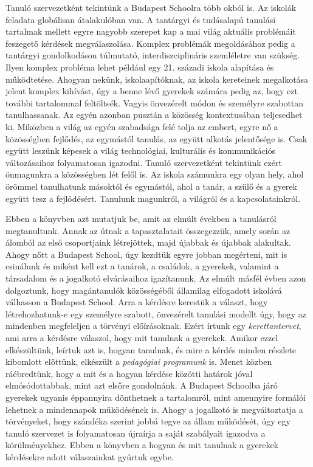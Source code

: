 Tanuló szervezetként tekintünk a Budapest Schoolra több okból is. Az iskolák feladata globálisan átalakulóban van. A tantárgyi és tudásalapú tanulási tartalmak mellett egyre nagyobb szerepet kap a mai világ aktuális problémáit feszegető kérdések megválaszolása. Komplex problémák megoldásához pedig a tantárgyi gondolkodáson túlmutató, interdiszciplináris szemléletre van szükség. Ilyen komplex probléma lehet például egy 21. századi iskola alapítása és működtetése. Ahogyan nekünk, iskolaapítóknak, az iskola kereteinek megalkotása jelent komplex kihívást, úgy a benne lévő gyerekek számára pedig az, hogy ezt további tartalommal feltöltsék. Vagyis önvezérelt módon és személyre szabottan tanulhassanak. Az egyén azonban pusztán a közösség kontextusában teljesedhet ki. Miközben a világ az egyén szabadsága felé tolja az embert, egyre nő a közösségben fejlődés, az egymástól tanulás, az együtt alkotás jelentősége is. Csak együtt leszünk képesek a világ technológiai, kulturális és kommunikációs változásaihoz folyamatosan igazodni. Tanuló szervezetként tekintünk ezért önmagunkra a közösségben lét felől is. Az iskola számunkra egy olyan hely, ahol örömmel tanulhatunk másoktól és egymástól, ahol a tanár, a szülő és a gyerek együtt tesz a fejlődésért. Tanulunk magunkról, a világról és a kapcsolatainkról.

Ebben a könyvben azt mutatjuk be, amit az elmúlt években a tanulásról megtanultunk. Annak az útnak a tapasztalatait összegezzük, amely során az álomból az első csoportjaink létrejöttek, majd újabbak és újabbak alakultak. Ahogy nőtt a Budapest School, úgy kezdtük egyre jobban megérteni, mit is csinálunk és miként kell ezt a tanárok, a családok, a gyerekek, valamint a társadalom és a jogalkotó elvárásaihoz igazítanunk. Az elmúlt másfél évben azon dolgoztunk, hogy magántanulók közösségéből államilag elfogadott iskolává válhasson a Budapest School. Arra a kérdésre kerestük a választ, hogy létrehozhatunk-e egy személyre szabott, önvezérelt tanulási modellt úgy, hogy az mindenben megfeleljen a törvényi előírásoknak. Ezért írtunk egy \emph{kerettantervet}, ami arra a kérdésre válaszol, hogy mit tanulnak a gyerekek. Amikor ezzel elkészültünk, leírtuk azt is, hogyan tanulnak, és mire a kérdés minden részlete kibomlott előttünk, elkészült a \emph{pedagógiai programunk} is. Menet közben ráébredtünk, hogy a mit és a hogyan kérdése közötti határok jóval elmósódottabbak, mint azt elsőre gondolnánk. A Budapest Schoolba járó gyerekek ugyanis éppannyira dönthetnek a tartalomról, mint amennyire formálói lehetnek a mindennapok működésének is. Ahogy a jogalkotó is megváltoztatja a törvényeket, hogy szándéka szerint jobbá tegye az állam működését, úgy egy tanuló szervezet is folyamatosan újraírja a saját szabályait igazodva a körülményekhez. Ebben a könyvben a hogyan és mit tanulnak a gyerekek kérdésekre adott válaszainkat gyúrtuk egybe.

